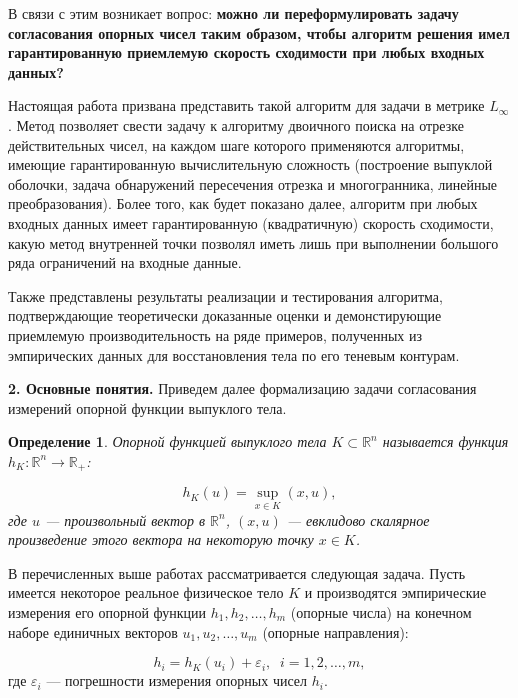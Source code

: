 \documentclass[a4paper, 11pt]{article}
\theoremstyle{MyDefinitionStyle}
\newtheorem{SmartDefinition}{Определение}
\theoremstyle{MyTheoremStyle}
\begin{document}
В связи с этим возникает вопрос: \textbf{можно ли переформулировать задачу
согласования опорных чисел таким образом, чтобы алгоритм решения имел
гарантированную приемлемую скорость сходимости при любых входных данных?}

Настоящая работа призвана представить такой алгоритм для задачи в метрике
$L_\infty$. Метод позволяет свести задачу к алгоритму двоичного
поиска на отрезке действительных чисел, на каждом шаге которого применяются
алгоритмы, имеющие гарантированную вычислительную сложность (построение
выпуклой оболочки, задача обнаружений пересечения отрезка и многогранника,
линейные преобразования).
Более того, как будет показано далее, алгоритм при любых входных данных
имеет гарантированную (квадратичную) скорость сходимости,
какую метод внутренней точки позволял иметь лишь при выполнении большого ряда
ограничений на входные данные.

Также представлены результаты реализации и тестирования алгоритма,
подтверждающие теоретически доказанные оценки и демонстирующие приемлемую
производительность на ряде примеров, полученных из эмпирических данных
для восстановления тела по его теневым контурам.

\textbf{2. Основные понятия.} Приведем далее формализацию задачи согласования
измерений опорной функции выпуклого тела.
\begin{SmartDefinition}
 \label{def:support-function}
 \emph{Опорной функцией} выпуклого тела $K \subset \mathbb{R}^{n}$
 называется функция $h_{K}: \mathbb{R}^{n} \to \mathbb{R}_{+}$:

 \begin{equation*}h_{K}(u) = \sup \limits_{x \in K}(x, u),\end{equation*}
где $u$ --- произвольный вектор в $\mathbb{R}^n$,
$(x, u)$ --- евклидово скалярное произведение этого вектора на некоторую точку
$x \in K$.
\end{SmartDefinition}

В перечисленных выше работах рассматривается следующая задача. Пусть
имеется некоторое реальное физическое тело $K$ и производятся эмпирические
измерения его опорной функции $h_{1}, h_{2}, \ldots, h_{m}$ (опорные числа) на
конечном наборе единичных векторов $u_{1}, u_{2}, \ldots, u_{m}$
(опорные направления):

\begin{equation*}
 h_{i} = h_{K}(u_{i}) + \varepsilon_{i}, \;\; i = 1, 2, \ldots, m,
\end{equation*}
где $\varepsilon_{i}$ --- погрешности измерения опорных чисел $h_{i}$.
\end{document}
